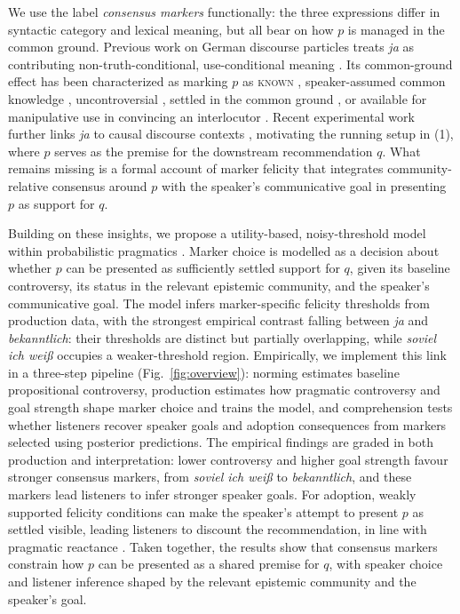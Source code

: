 \documentclass[11pt,a4paper]{article}
\begin{document}
We use the label \emph{consensus markers} functionally: the three expressions differ in syntactic category and lexical meaning, but all bear on how $p$ is managed in the common ground.
Previous work on German discourse particles treats \textit{ja} as contributing non-truth-conditional, use-conditional meaning \citep{gutzmann2015use,grosz2021discourse}.
Its common-ground effect has been characterized as marking $p$ as \textsc{known} \citep{thurmair1989modalpartikeln}, speaker-assumed common knowledge \citep{karagjosova2004meaning}, uncontroversial \citep{jacobs_semantics_1991,zimmermann2011discourse,waltereit2001modal}, settled in the common ground \citep{repp2013common}, or available for manipulative use in convincing an interlocutor \citep{doring2016modal}.
Recent experimental work further links \textit{ja} to causal discourse contexts \citep{seemann2025}, motivating the running setup in (1), where $p$ serves as the premise for the downstream recommendation $q$.
What remains missing is a formal account of marker felicity that integrates community-relative consensus around $p$ with the speaker’s communicative goal in presenting $p$ as support for $q$.

Building on these insights, we propose a utility-based, noisy-threshold model within probabilistic pragmatics \citep{goodman2016pragmatic, franke2016probabilistic, degen2023rational}.
Marker choice is modelled as a decision about whether $p$ can be presented as sufficiently settled support for $q$, given its baseline controversy, its status in the relevant epistemic community, and the speaker’s communicative goal.
The model infers marker-specific felicity thresholds from production data, with the strongest empirical contrast falling between \textit{ja} and \textit{bekanntlich}: their thresholds are distinct but partially overlapping, while \textit{soviel ich wei\ss} occupies a weaker-threshold region.
Empirically, we implement this link in a three-step pipeline (Fig.~\ref{fig:overview}): norming estimates baseline propositional controversy, production estimates how pragmatic controversy and goal strength shape marker choice and trains the model, and comprehension tests whether listeners recover speaker goals and adoption consequences from markers selected using posterior predictions.
The empirical findings are graded in both production and interpretation: lower controversy and higher goal strength favour stronger consensus markers, from \textit{soviel ich wei\ss} to \textit{bekanntlich}, and these markers lead listeners to infer stronger speaker goals.
For adoption, weakly supported felicity conditions can make the speaker's attempt to present $p$ as settled visible, leading listeners to discount the recommendation, in line with pragmatic reactance \citep{Brehm1966-BREATO-2}.
Taken together, the results show that consensus markers constrain how $p$ can be presented as a shared premise for $q$, with speaker choice and listener inference shaped by the relevant epistemic community and the speaker's goal.
\end{document}
